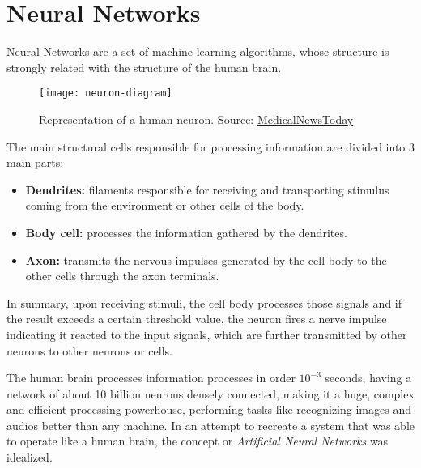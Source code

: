 \section{Neural Networks}\label{sec:nn}
Neural Networks are a set of machine learning algorithms, whose structure is strongly related with the structure of the human brain. 
\begin{figure}[H]
    \texttt{[image: neuron-diagram]}
    \caption{Representation of a human neuron. Source: \href{https://www.medicalnewstoday.com/articles/320289}{MedicalNewsToday}}
\end{figure}
The main structural cells responsible for processing information are divided into 3 main parts:
\begin{itemize}
    \item \textbf{Dendrites:} filaments responsible for receiving and transporting stimulus coming from the environment or other cells of the body.
    \item \textbf{Body cell:} processes the information gathered by the dendrites.
    \item \textbf{Axon:} transmits the nervous impulses generated by the cell body to the other cells through the axon terminals.
\end{itemize}
In summary, upon receiving stimuli, the cell body processes those signals and if the result exceeds a certain threshold value, the neuron fires a nerve impulse indicating it reacted to the input signals, which are further transmitted by other neurons to other neurons or cells.

The human brain processes information processes in order $10^{-3}$ seconds, having a network of about 10 billion neurons densely connected, making it a huge, complex and efficient processing powerhouse, performing tasks like recognizing images and audios better than any machine. In an attempt to recreate a system that was able to operate like a human brain, the concept or \textit{Artificial Neural Networks} was idealized.

